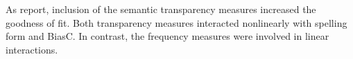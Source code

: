 As \citet{Marellietal:2014} report, inclusion of the semantic
transparency measures increased the goodness of fit. Both transparency
measures interacted nonlinearly with spelling form and BiasC. 
In
contrast, the frequency measures were involved in linear interactions.


